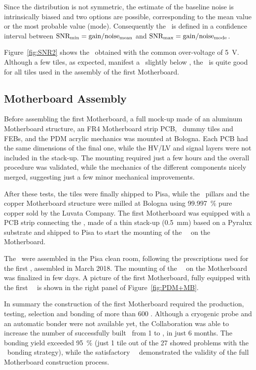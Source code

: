 Since the distribution is not symmetric, the estimate of the baseline noise is intrinsically biased and two options are possible, corresponding to the mean value or the most probable value (mode). Consequently the \SNR\ is defined in a confidence interval between $\mbox{SNR}_{\rm min} = {\rm gain}/{\rm noise}_{\rm mean}$ and $\mbox{SNR}_{\rm max} = {\rm gain}/{\rm noise}_{\rm mode}$.

Figure~\ref{fig:SNR2} shows the \SNR\ obtained with the common over-voltage of \SI{5}{\volt}. Although a few tiles, as expected, manifest a \SNR\ slightly below \DSkTileChargeSNRSpecification, the \SNR\ is quite good for all tiles used in the assembly of the first Motherboard.


\subsection{Motherboard Assembly}

Before assembling the first Motherboard, a full mock-up made of an aluminum Motherboard structure, an FR4 Motherboard strip PCB, \DSkSQBPdmsNumber\ dummy tiles and FEBs, and the PDM acrylic mechanics was mounted at Bologna. Each PCB had the same dimensions of the final one, while the HV/LV and signal layers were not included in the stack-up. The mounting required just a few hours and the overall procedure was validated, while the mechanics of the different components nicely merged, suggesting just a few minor mechanical improvements. 

After these tests, the tiles were finally shipped to Pisa, while the \DSkPdm\ pillars and the copper Motherboard structure were milled at Bologna using \SI{99.997}{\percent} pure copper sold by the Luvata Company. The first Motherboard was equipped with a PCB strip connecting the \DSkPdms, made of a thin stack-up (\SI{0.5}{\milli\meter}) based on a Pyralux substrate and shipped to Pisa to start the mounting of the \DSkSQBPdmsNumber\ \DSkPdms\ on the Motherboard. 

The \DSkPdms\ were assembled in the Pisa clean room, following the prescriptions used for the first \DSkPdm, assembled in March 2018. The mounting of the \DSkSQBPdmsNumber\ \DSkPdms\ on the Motherboard was finalized in few days.  A picture of the first Motherboard, fully equipped with the first \DSkSQBPdmsNumber\  \DSkPdms\ is shown in the right panel of Figure~\ref{fig:PDM+MB}.

In summary the construction of the first Motherboard required the production, testing, selection and bonding of more than 600 \SiPMs. Although a cryogenic probe and an automatic bonder were not available yet, the Collaboration was able to increase the number of successfully built \DSkPdms\ from 1 to \DSkSQBPdmsNumber, in just \num{6} months. The bonding yield exceeded \SI{95}{\percent} (just 1 tile out of the 27 showed problems with the \SiPM\ bonding strategy), while the satisfactory \DSkPdm\ \SNR\ demonstrated the validity of the full Motherboard construction process.

